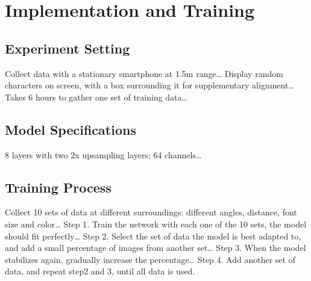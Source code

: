 \section{Implementation and Training}

\label{sec-implementation-and-evaluation}



\subsection{Experiment Setting}
Collect data with a stationary smartphone at 1.5m range…
Display random characters on screen, with a box surrounding it for supplementary alignment…
Takes 6 hours to gather one set of training data…
\subsection{Model Specifications}
8 layers with two 2x upsampling layers; 64 channels…
\subsection{Training Process}
Collect 10 sets of data at different surroundings: different angles, distance, font size and color…
Step 1. Train the network with each one of the 10 sets, the model should fit perfectly…
Step 2. Select the set of data the model is best adapted to, and add a small percentage of images from another set…
Step 3. When the model stabilizes again, gradually increase the percentage…
Step 4. Add another set of data, and repeat step2 and 3, until all data is used.

